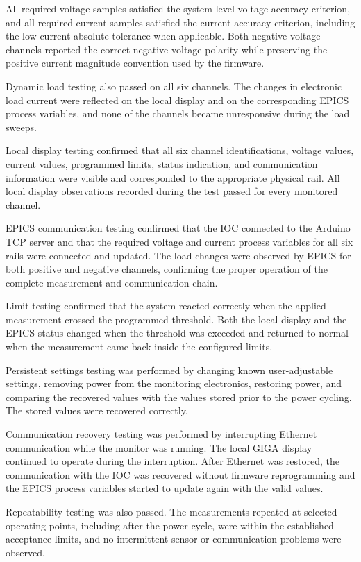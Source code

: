 All required voltage samples satisfied the system-level voltage accuracy criterion, and all required current samples satisfied the current accuracy criterion, including the low current absolute tolerance when applicable. Both negative voltage channels reported the correct negative voltage polarity while preserving the positive current magnitude convention used by the firmware.

Dynamic load testing also passed on all six channels. The changes in electronic load current were reflected on the local display and on the corresponding EPICS process variables, and none of the channels became unresponsive during the load sweeps.

Local display testing confirmed that all six channel identifications, voltage values, current values, programmed limits, status indication, and communication information were visible and corresponded to the appropriate physical rail. All local display observations recorded during the test passed for every monitored channel.

EPICS communication testing confirmed that the IOC connected to the Arduino TCP server and that the required voltage and current process variables for all six rails were connected and updated. The load changes were observed by EPICS for both positive and negative channels, confirming the proper operation of the complete measurement and communication chain.

Limit testing confirmed that the system reacted correctly when the applied measurement crossed the programmed threshold. Both the local display and the EPICS status changed when the threshold was exceeded and returned to normal when the measurement came back inside the configured limits.

Persistent settings testing was performed by changing known user-adjustable settings, removing power from the monitoring electronics, restoring power, and comparing the recovered values with the values stored prior to the power cycling. The stored values were recovered correctly.

Communication recovery testing was performed by interrupting Ethernet communication while the monitor was running. The local GIGA display continued to operate during the interruption. After Ethernet was restored, the communication with the IOC was recovered without firmware reprogramming and the EPICS process variables started to update again with the valid values.

Repeatability testing was also passed. The measurements repeated at selected operating points, including after the power cycle, were within the established acceptance limits, and no intermittent sensor or communication problems were observed.

